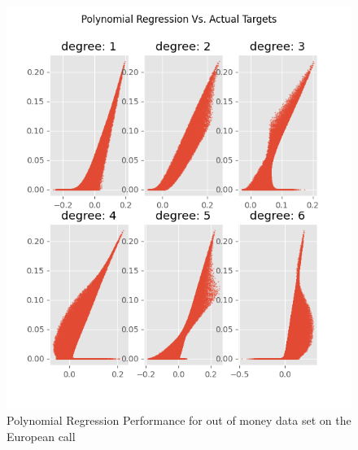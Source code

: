 \begin{figure}[H]
\centering
\includegraphics{Figures/polynomialOutMoneyEuroC.png}
\decoRule
\caption[Polynomial Regression Performance for out-of-money data set European Call]{Polynomial Regression Performance for out of money data set on the European call}
\label{fig:MLPsEuroCOutOfMoney}
\end{figure}

